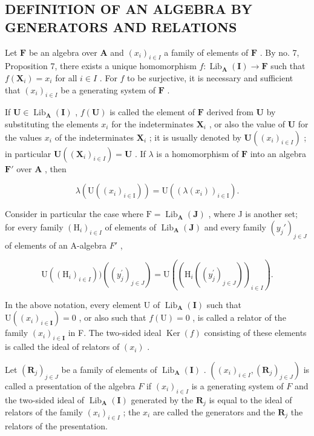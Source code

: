 \subsection{DEFINITION OF AN ALGEBRA BY GENERATORS AND RELATIONS}

Let \(\mathbf{F}\) be an algebra over \(\mathbf{A}\) and \((x_{i})_{i\in I}\) a family of elements of \(\mathbf{F}\) . By no. 7, Proposition 7, there exists a unique homomorphism \(f\colon \operatorname{Lib}_{\mathbf{A}}(\mathbf{I})\to \mathbf{F}\) such that \(f(\mathbf{X}_i) = x_i\) for all \(i\in I\) . For \(f\) to be surjective, it is necessary and sufficient that \((x_{i})_{i\in I}\) be a generating system of \(\mathbf{F}\) .

If \(\mathbf{U} \in \operatorname{Lib}_{\mathbf{A}}(\mathbf{I})\) , \(f(\mathbf{U})\) is called the element of \(\mathbf{F}\) derived from \(\mathbf{U}\) by substituting the elements \(x_{i}\) for the indeterminates \(\mathbf{X}_{i}\) , or also the value of \(\mathbf{U}\) for the values \(x_{i}\) of the indeterminates \(\mathbf{X}_{i}\) ; it is usually denoted by \(\mathbf{U}((x_{i})_{i \in I})\) ; in particular \(\mathbf{U}((\mathbf{X}_{i})_{i \in I}) = \mathbf{U}\) . If \(\lambda\) is a homomorphism of \(\mathbf{F}\) into an algebra \(\mathbf{F}'\) over \(\mathbf{A}\) , then

\[
\lambda (\mathrm{U} ((x _ {i}) _ {i \in \mathrm{I}})) = \mathrm{U} ((\lambda (x _ {i})) _ {i \in \mathrm{I}}).
\]

Consider in particular the case where \(\mathrm{F} = \operatorname{Lib}_{\mathbf{A}}(\mathbf{J})\) , where J is another set; for every family \((\mathrm{H}_{i})_{i \in I}\) of elements of \(\operatorname{Lib}_{\mathbf{A}}(\mathbf{J})\) and every family \((y_{j}')_{j \in J}\) of elements of an A-algebra \(F'\) ,

\[
\mathrm{U} ((\mathrm{H} _ {i}) _ {i \in I})) ((y _ {j} ^ {\prime}) _ {j \in J}) = \mathrm{U} ((\mathrm{H} _ {i} ((y _ {j} ^ {\prime}) _ {j \in J})) _ {i \in I}).\tag{37}
\]

In the above notation, every element U of \(\operatorname{Lib}_{\mathbf{A}}(\mathbf{I})\) such that \(\mathrm{U}((x_{i})_{i\in\mathbf{I}})=0\) , or also such that \(f(\mathrm{U})=0\) , is called a relator of the family \((x_{i})_{i\in\mathbf{I}}\) in F. The two-sided ideal \(\operatorname{Ker}(f)\) consisting of these elements is called the ideal of relators of \((x_{i})\) .

Let \((\mathbf{R}_j)_{j\in J}\) be a family of elements of \(\operatorname{Lib}_{\mathbf{A}}(\mathbf{I})\) . \(((x_i)_{i\in I}, (\mathbf{R}_j)_{j\in J})\) is called a presentation of the algebra \(F\) if \((x_i)_{i\in I}\) is a generating system of \(F\) and the two-sided ideal of \(\operatorname{Lib}_{\mathbf{A}}(\mathbf{I})\) generated by the \(\mathbf{R}_j\) is equal to the ideal of relators of the family \((x_i)_{i\in I}\) ; the \(x_i\) are called the generators and the \(\mathbf{R}_j\) the relators of the presentation.

